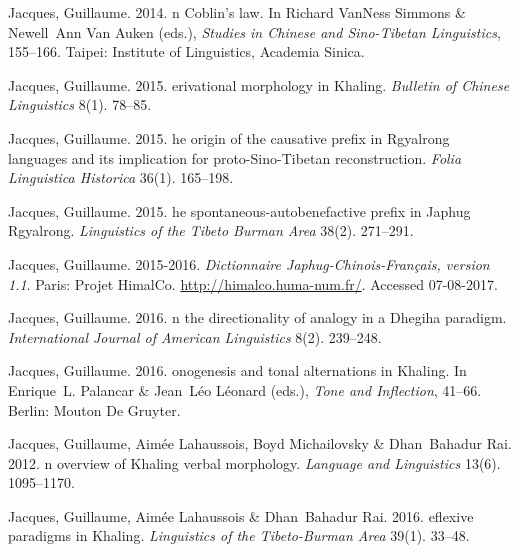 \documentclass[oneside,a4paper,11pt]{article}
\begin{document}
\begin{thebibliography}{65}
Jacques, Guillaume. 2014{}.
n {C}oblin's law.
\newblock In Richard {VanNess Simmons} \& Newell~Ann {Van Auken} (eds.),
  \emph{{S}tudies in {C}hinese and {S}ino-{T}ibetan {L}inguistics}, 155--166.
  Taipei: Institute of Linguistics, Academia Sinica.

Jacques, Guillaume. 2015{}.
erivational morphology in {K}haling.
\newblock \emph{Bulletin of Chinese Linguistics} 8(1). 78--85.

Jacques, Guillaume. 2015{}.
he origin of the causative prefix in {R}gyalrong languages and its
  implication for proto-{S}ino-{T}ibetan reconstruction.
\newblock \emph{Folia Linguistica Historica} 36(1). 165–198.

Jacques, Guillaume. 2015{}.
he spontaneous-autobenefactive prefix in {J}aphug {R}gyalrong.
\newblock \emph{Linguistics of the Tibeto Burman Area} 38(2). 271–291.

Jacques, Guillaume. 2015-2016.
\newblock \emph{{D}ictionnaire {J}aphug-{C}hinois-{F}rançais, version 1.1}.
\newblock Paris: Projet HimalCo.
\newblock \urlprefix\url{http://himalco.huma-num.fr/}. Accessed 07-08-2017.

Jacques, Guillaume. 2016{}.
n the directionality of analogy in a {D}hegiha paradigm.
\newblock \emph{International Journal of American Linguistics} 8(2). 239--248.

Jacques, Guillaume. 2016{}.
onogenesis and tonal alternations in {K}haling.
\newblock In Enrique~L. Palancar \& Jean~Léo Léonard (eds.), \emph{{T}one and
  {I}nflection}, 41--66. Berlin: Mouton De Gruyter.

Jacques, Guillaume, Aimée Lahaussois, Boyd Michailovsky \& Dhan~Bahadur Rai.
  2012.
n overview of {K}haling verbal morphology.
\newblock \emph{Language and Linguistics} 13(6). 1095--1170.

Jacques, Guillaume, Aimée Lahaussois \& Dhan~Bahadur Rai. 2016.
eflexive paradigms in {K}haling.
\newblock \emph{Linguistics of the Tibeto-Burman Area} 39(1). 33--48.


\end{thebibliography}
\end{document}

